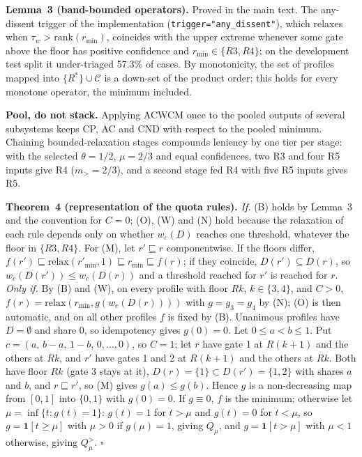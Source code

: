 \documentclass[11pt,a4paper]{article}%
\begin{document}
\textbf{Lemma~3 (band-bounded operators).} Proved in the main text. The any-dissent trigger of the implementation (\texttt{trigger="any\_dissent"}), which relaxes when $\tau_w>\text{rank}(r_{\min})$, coincides with the upper extreme whenever some gate above the floor has positive confidence and $r_{\min}\in\{R3,R4\}$; on the development test split it under-triaged 57.3\% of cases. By monotonicity, the set of profiles mapped into $\{R^*\}\cup\mathcal{C}$ is a down-set of the product order; this holds for every monotone operator, the minimum included.

\textbf{Pool, do not stack.} Applying ACWCM once to the pooled outputs of several subsystems keeps CP, AC and CND with respect to the pooled minimum. Chaining bounded-relaxation stages compounds leniency by one tier per stage: with the selected $\theta=1/2$, $\mu=2/3$ and equal confidences, two R3 and four R5 inputs give R4 ($m_>=2/3$), and a second stage fed R4 with five R5 inputs gives R5.

\textbf{Theorem~4 (representation of the quota rules).} \emph{If.} (B) holds by Lemma~3 and the convention for $C=0$; (O), (W) and (N) hold because the relaxation of each rule depends only on whether $w_c(D)$ reaches one threshold, whatever the floor in $\{R3,R4\}$. For (M), let $r'\sqsubseteq r$ componentwise. If the floors differ, $f(r')\sqsubseteq\text{relax}(r'_{\min},1)\sqsubseteq r_{\min}\sqsubseteq f(r)$; if they coincide, $D(r')\subseteq D(r)$, so $w_c(D(r'))\le w_c(D(r))$ and a threshold reached for $r'$ is reached for $r$.
\emph{Only if.} By (B) and (W), on every profile with floor $Rk$, $k\in\{3,4\}$, and $C>0$, $f(r)=\text{relax}(r_{\min},g(w_c(D(r))))$ with $g=g_3=g_4$ by (N); (O) is then automatic, and on all other profiles $f$ is fixed by (B). Unanimous profiles have $D=\emptyset$ and share $0$, so idempotency gives $g(0)=0$. Let $0\le a<b\le1$. Put $c=(a,\,b-a,\,1-b,\,0,\ldots,0)$, so $C=1$; let $r$ have gate 1 at $R(k+1)$ and the others at $Rk$, and $r'$ have gates 1 and 2 at $R(k+1)$ and the others at $Rk$. Both have floor $Rk$ (gate 3 stays at it), $D(r)=\{1\}\subset D(r')=\{1,2\}$ with shares $a$ and $b$, and $r\sqsubseteq r'$, so (M) gives $g(a)\le g(b)$. Hence $g$ is a non-decreasing map from $[0,1]$ into $\{0,1\}$ with $g(0)=0$. If $g\equiv0$, $f$ is the minimum; otherwise let $\mu=\inf\{t:g(t)=1\}$: $g(t)=1$ for $t>\mu$ and $g(t)=0$ for $t<\mu$, so $g=\mathbf{1}[t\ge\mu]$ with $\mu>0$ if $g(\mu)=1$, giving $Q_\mu$, and $g=\mathbf{1}[t>\mu]$ with $\mu<1$ otherwise, giving $Q^{>}_\mu$. $\square$
\end{document}
